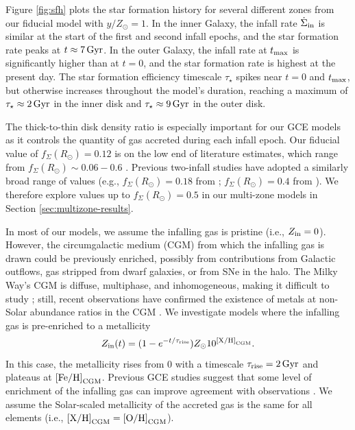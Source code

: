 \documentclass[twocolumn,twocolappendix,linenumbers]{aastex631}
\newcommand{\mathXH}{{\rm [X/H]}}
\newcommand{\mathOH}{{\rm [O/H]}}
\newcommand{\mathFeH}{{\rm [Fe/H]}}
\begin{document}
Figure \ref{fig:sfh} plots the star formation history for several different zones from our fiducial model with $y/Z_\odot=1$. In the inner Galaxy, the infall rate $\dot\Sigma_{\rm in}$ is similar at the start of the first and second infall epochs, and the star formation rate peaks at $t\approx7\,{\rm Gyr}$. In the outer Galaxy, the infall rate at $t_{\rm max}$ is significantly higher than at $t=0$, and the star formation rate is highest at the present day. The star formation efficiency timescale $\tau_\star$ spikes near $t=0$ and $t_{\rm max}$, but otherwise increases throughout the model's duration, reaching a maximum of $\tau_\star\approx2\,{\rm Gyr}$ in the inner disk and $\tau_\star\approx 9\,{\rm Gyr}$ in the outer disk.

The thick-to-thin disk density ratio is especially important for our GCE models as it controls the quantity of gas accreted during each infall epoch. Our fiducial value of $f_\Sigma(R_\odot)=0.12$ is on the low end of literature estimates, which range from $f_\Sigma(R_\odot)\sim0.06-0.6$ \citep[e.g.,][]{gilmore_new_1983,siegel_star_2002,juric_milky_2008,mackereth_age-metallicity_2017,fuhrmann_local_2017}. Previous two-infall studies have adopted a similarly broad range of values (e.g., $f_\Sigma(R_\odot)=0.18$ from \citealt{spitoni_apogee_2021}; $f_\Sigma(R_\odot)=0.4$ from \citealt{spitoni_remind_2024}). We therefore explore values up to $f_\Sigma(R_\odot)=0.5$ in our multi-zone models in Section \ref{sec:multizone-results}.

In most of our models, we assume the infalling gas is pristine (i.e., $Z_{\rm in}=0$). However, the circumgalactic medium (CGM) from which the infalling gas is drawn could be previously enriched, possibly from contributions from Galactic outflows, gas stripped from dwarf galaxies, or from SNe in the halo. The Milky Way's CGM is diffuse, multiphase, and inhomogeneous, making it difficult to study \citep[e.g.,][]{tumlinson_circumgalactic_2017,mathur_probing_2022}; still, recent observations have confirmed the existence of metals at non-Solar abundance ratios in the CGM \citep[e.g.,][]{das_discovery_2019,das_hot_2021,gupta_supervirial_2021}. We investigate models where the infalling gas is pre-enriched to a metallicity
\begin{equation}
    \label{eq:pre-enrichment}
    Z_{\rm in}(t) = (1 - e^{-t/\tau_{\rm rise}}) Z_\odot 10^{\mathXH_{\rm CGM}}.
\end{equation}
In this case, the metallicity rises from 0 with a timescale $\tau_{\rm rise}=2\,{\rm Gyr}$ and plateaus at $\mathFeH_{\rm CGM}$. Previous GCE studies suggest that some level of enrichment of the infalling gas can improve agreement with observations \citep[e.g.,][]{palla_chemical_2020,johnson_milky_2024,spitoni_remind_2024}. We assume the Solar-scaled metallicity of the accreted gas is the same for all elements (i.e., $\mathXH_{\rm CGM}=\mathOH_{\rm CGM}$).
\end{document}
